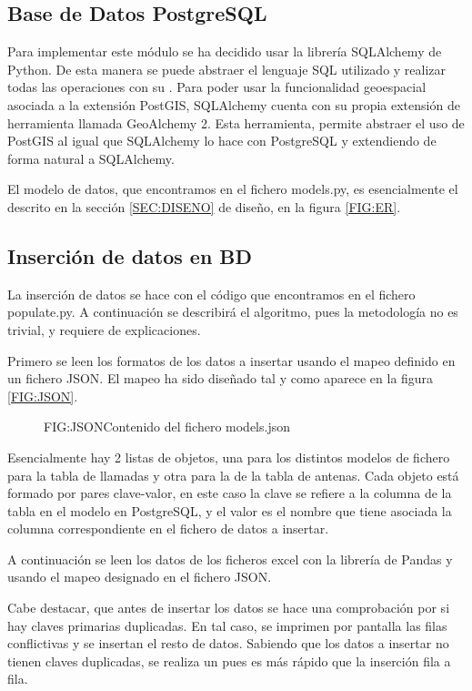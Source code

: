       
    \subsection{Base de Datos PostgreSQL}
      Para implementar este módulo se ha decidido usar la librería SQLAlchemy\cite{sqlalchemy} de Python. De esta manera se puede abstraer el lenguaje SQL utilizado y realizar todas las operaciones con su . 
      Para poder usar la funcionalidad geoespacial asociada a la extensión PostGIS, SQLAlchemy cuenta con su propia extensión de herramienta llamada GeoAlchemy 2\cite{geoalchemy}. Esta herramienta, permite abstraer el uso de PostGIS al igual que SQLAlchemy lo hace con PostgreSQL y extendiendo de forma natural a SQLAlchemy.
      
      El modelo de datos, que encontramos en el fichero models.py, es esencialmente el descrito en la sección \ref{SEC:DISENO} de diseño, en la figura \ref{FIG:ER}.
    
    
    \subsection{Inserción de datos en BD\label{SS:IDAT}}
      La inserción de datos se hace con el código que encontramos en el fichero populate.py. A continuación se describirá el algoritmo, pues la metodología no es trivial, y requiere de explicaciones.
      
      Primero se leen los formatos de los datos a insertar usando el mapeo definido en un fichero JSON.
      El mapeo ha sido diseñado tal y como aparece en la figura \ref{FIG:JSON}. 
      
      \begin{figure}[Contenido del fichero models.json]{FIG:JSON}{Contenido del fichero models.json}
      \end{figure}
      
      Esencialmente hay 2 listas de objetos, una para los distintos modelos de fichero para la tabla de llamadas y otra para la de la tabla de antenas.
      Cada objeto está formado por pares clave-valor, en este caso la clave se refiere a la columna de la tabla en el modelo en PostgreSQL, y el valor es el nombre que tiene asociada la columna correspondiente en el fichero de datos a insertar.
    
      A continuación se leen los datos de los ficheros excel con la librería de Pandas y usando el mapeo designado en el fichero JSON.

      Cabe destacar, que antes de insertar los datos se hace una comprobación por si hay claves primarias duplicadas. En tal caso, se imprimen por pantalla las filas conflictivas y se insertan el resto de datos.
      Sabiendo que los datos a insertar no tienen claves duplicadas, se realiza un  pues es más rápido que la inserción fila a fila.
